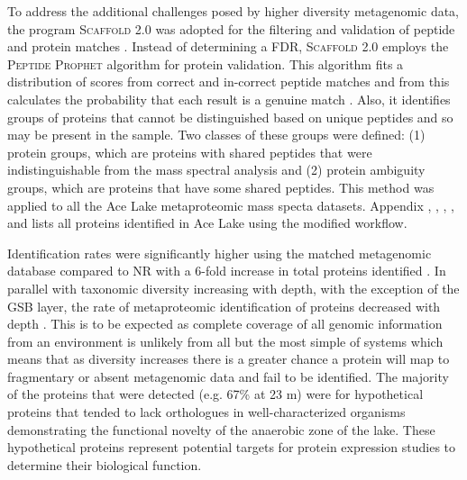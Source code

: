 To address the additional challenges posed by higher diversity metagenomic data, the program \textsc{Scaffold} 2.0 was adopted for the filtering and validation of peptide and protein matches . 
Instead of determining a \ac{FDR}, \textsc{Scaffold} 2.0 employs the \textsc{Peptide Prophet} algorithm \cite{Keller2002} for protein validation.
This algorithm fits a distribution of scores from correct and in-correct peptide matches and from this calculates the probability that each result is a genuine match \cite{Keller2002}. 
Also, it identifies groups of proteins that cannot be distinguished based on unique peptides and so may be present in the sample.
Two classes of these groups were defined: (1) protein groups, which are proteins with shared peptides that were indistinguishable from the mass spectral analysis and (2) protein ambiguity groups, which are proteins that have some shared peptides.
This method was applied to all the Ace Lake metaproteomic mass specta datasets.
Appendix , , , ,  and  lists all proteins identified in Ace Lake using the modified workflow. 

Identification rates were significantly higher using the matched metagenomic database compared to \ac{NR} with a 6-fold increase in total proteins identified . 
In parallel with taxonomic diversity increasing with depth, with the exception of the \ac{GSB} layer, the rate of metaproteomic identification of proteins decreased with depth .
This is to be expected as complete coverage of all genomic information from an environment is unlikely from all but the most simple of systems which means that as diversity increases there is a greater chance a protein will map to fragmentary or absent metagenomic data and fail to be identified.
The majority of the proteins that were detected (e.g. 67\% at 23 m)  were for hypothetical proteins that tended to lack orthologues in well-characterized organisms demonstrating the functional novelty of the anaerobic zone of the lake.
These hypothetical proteins represent potential targets for protein expression studies to determine their biological function.

